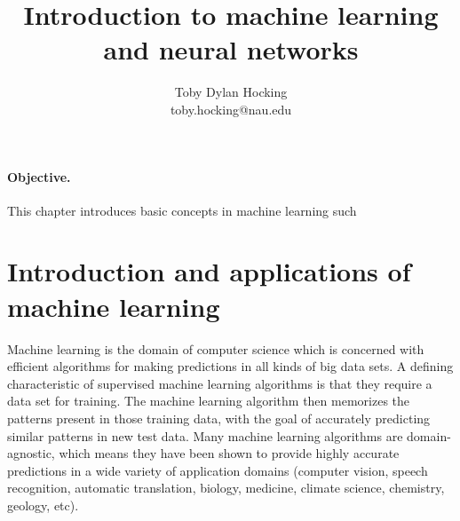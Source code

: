 \documentclass[12pt]{article}
\begin{document}
\title{Introduction to machine learning and neural networks}

\author{
  Toby Dylan Hocking\\
  toby.hocking@nau.edu
}

\maketitle









\paragraph{Objective.} This chapter introduces basic concepts in machine learning such

\section{Introduction and applications of machine learning}

Machine learning is the domain of computer science which is concerned
with efficient algorithms for making predictions in all kinds of big
data sets. A defining characteristic of supervised machine learning
algorithms is that they require a data set for training. The machine
learning algorithm then memorizes the patterns present in those
training data, with the goal of accurately predicting similar patterns
in new test data. Many machine learning algorithms are
domain-agnostic, which means they have been shown to provide highly
accurate predictions in a wide variety of application domains
(computer vision, speech recognition, automatic translation, biology,
medicine, climate science, chemistry, geology, etc). 
\end{document}
